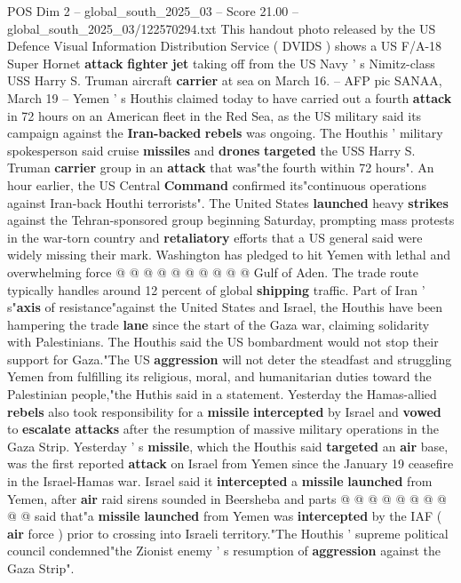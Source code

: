 \begin{textsample}{POS Dim 2 – global\_south\_2025\_03 – Score 21.00 – global\_south\_2025\_03/122570294.txt}  \label{ex:f2_pos_283}
This handout photo released by the US Defence Visual Information Distribution Service ( DVIDS ) shows a US F/A-18 Super Hornet \textbf{attack} \textbf{fighter} \textbf{jet} taking off from the US Navy ' s Nimitz-class USS Harry S.
Truman aircraft \textbf{carrier} at sea on March 16. -- AFP pic SANAA, March 19 -- Yemen ' s Houthis claimed today to have carried out a fourth \textbf{attack} in 72 hours on an American fleet in the Red Sea, as the US military said its campaign against the \textbf{Iran-backed} \textbf{rebels} was ongoing.
The Houthis ' military spokesperson said cruise \textbf{missiles} and \textbf{drones} \textbf{targeted} the USS Harry S.
Truman \textbf{carrier} group in an \textbf{attack} that was"the fourth within 72 hours".
An hour earlier, the US Central \textbf{Command} confirmed its"continuous operations against Iran-back Houthi terrorists".
The United States \textbf{launched} heavy \textbf{strikes} against the Tehran-sponsored group beginning Saturday, prompting mass protests in the war-torn country and \textbf{retaliatory} efforts that a US general said were widely missing their mark.
Washington has pledged to hit Yemen with lethal and overwhelming force @ @ @ @ @ @ @ @ @ @ Gulf of Aden.
The trade route typically handles around 12 percent of global \textbf{shipping} traffic.
Part of Iran ' s"\textbf{axis} of resistance"against the United States and Israel, the Houthis have been hampering the trade \textbf{lane} since the start of the Gaza war, claiming solidarity with Palestinians.
The Houthis said the US bombardment would not stop their support for Gaza."The US \textbf{aggression} will not deter the steadfast and struggling Yemen from fulfilling its religious, moral, and humanitarian duties toward the Palestinian people,"the Huthis said in a statement.
Yesterday the Hamas-allied \textbf{rebels} also took responsibility for a \textbf{missile} \textbf{intercepted} by Israel and \textbf{vowed} to \textbf{escalate} \textbf{attacks} after the resumption of massive military operations in the Gaza Strip.
Yesterday ' s \textbf{missile}, which the Houthis said \textbf{targeted} an \textbf{air} base, was the first reported \textbf{attack} on Israel from Yemen since the January 19 ceasefire in the Israel-Hamas war.
Israel said it \textbf{intercepted} a \textbf{missile} \textbf{launched} from Yemen, after \textbf{air} raid sirens sounded in Beersheba and parts @ @ @ @ @ @ @ @ @ @ said that"a \textbf{missile} \textbf{launched} from Yemen was \textbf{intercepted} by the IAF ( \textbf{air} force ) prior to crossing into Israeli territory."The Houthis ' supreme political council condemned"the Zionist enemy ' s resumption of \textbf{aggression} against the Gaza Strip".

\end{textsample}
